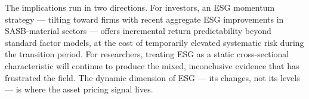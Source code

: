 The implications run in two directions. For investors, an ESG momentum strategy --- tilting toward firms with recent aggregate ESG improvements in SASB-material sectors --- offers incremental return predictability beyond standard factor models, at the cost of temporarily elevated systematic risk during the transition period. For researchers, treating ESG as a static cross-sectional characteristic will continue to produce the mixed, inconclusive evidence that has frustrated the field. The dynamic dimension of ESG --- its changes, not its levels --- is where the asset pricing signal lives.